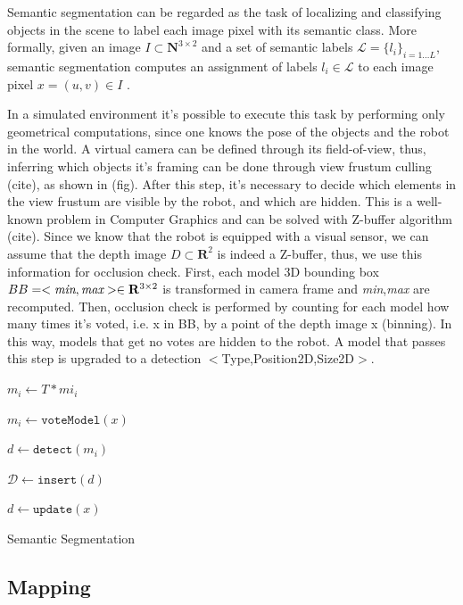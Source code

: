 \documentclass{article}
\begin{document}
	Semantic segmentation can be regarded as the task of localizing and classifying objects in the scene to label each image pixel with its semantic class.
	More formally, given an image $I \subset \mathbf{N}^{3 \times 2}$ and a set of semantic labels $\mathcal{L} = \{l_i\}_{i=1 \dots L}$, semantic segmentation computes an assignment of labels $l_i \in \mathcal{L}$ to each image pixel $x = (u,v) \in I$ .
	
	In a simulated environment it's possible to execute this task by performing only geometrical computations, since one knows the pose of the objects and the robot in the world.	A virtual camera can be defined through its field-of-view, thus, inferring which objects it's framing can be done through view frustum culling (cite), as shown in (fig). After this step, it's necessary to decide which elements in the view frustum are visible by the robot, and which are hidden. This is a well-known problem in Computer Graphics and can be solved with Z-buffer algorithm (cite). Since we know that the robot is equipped with a visual sensor, we can assume that the depth image $D \subset \mathbf{R}^2$ is indeed a Z-buffer, thus, we use this information for occlusion check. First, each model 3D bounding box $BB = < \emph{min} ,\emph{max} > \in \mathbf{R}^{3 \times 2}$ is transformed in camera frame and \emph{min},\emph{max} are recomputed. Then, occlusion check is performed by counting for each model how many times it's voted, i.e. x in BB, by a point of the depth image x (binning). In this way, models that get no votes are hidden to the robot. A model that passes this step is upgraded to a detection $<$Type,Position2D,Size2D$>$. 
	
	\begin{center}
		\begin{algorithm}[H]
			{
				$m_i \leftarrow T \ast mi_i$
			}
			{
				$m_i \leftarrow \texttt{voteModel}(x)$
				
				{
					$d \leftarrow \texttt{detect}(m_i)$
					
					$\mathcal{D} \leftarrow \texttt{insert}(d)$
				}
				
				$d \leftarrow \texttt{update}(x)$
			}
		\caption{Semantic Segmentation}
		\end{algorithm}
	\end{center}
	
	\subsection*{Mapping}
	
\end{document}
